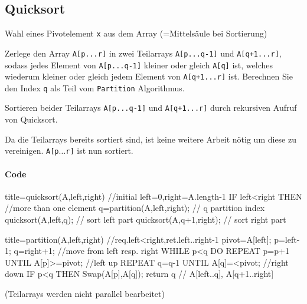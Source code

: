 \documentclass[
    ngerman,
    color=3b,
    dark_mode,
    summary,
    boxarc,
]{rubos-tuda-template}
\begin{document}
\clearpage
\subsection{Quicksort}\label{Quicksort}
\begin{idea}[Quicksort]\mbox{}
    \begin{description}[leftmargin=2.5cm,itemsep=1em]
        \item [Pivotelement]
              Wahl eines Pivotelement \texttt{x} aus dem Array (=Mittelsäule bei Sortierung)
        \item [Divide]
              Zerlege den Array \texttt{A[p...r]} in zwei Teilarrays \texttt{A[p...q-1]} und \texttt{A[q+1...r]},
              sodass jedes Element von \texttt{A[p...q-1]} kleiner oder gleich \texttt{A[q]} ist, welches
              wiederum kleiner oder gleich jedem Element von \texttt{A[q+1...r]} ist. Berechnen Sie den Index \texttt{q}
              als Teil vom \texttt{Partition} Algorithmus.
        \item [Conquer]
              Sortieren beider Teilarrays \texttt{A[p...q-1]} und \texttt{A[q+1...r]} durch rekursiven Aufruf von
              Quicksort.
        \item [Combine]
              Da die Teilarrays bereits sortiert sind, ist keine weitere Arbeit nötig um diese zu vereinigen.
              \texttt{A[p$\ldots$r]} ist nun sortiert.
    \end{description}

\end{idea}

\paragraph{Code}\mbox{}
          \begin{codeBlock}[autogobble,escapeinside=||]{title={quicksort(A,left,right)} //initial left=0,right=A.length-1}
            IF left<right THEN //more than one element
                q=partition(A,left,right); // q partition index
                quicksort(A,left,q); // sort left part
                quicksort(A,q+1,right); // sort right part
          \end{codeBlock}
          \begin{codeBlock}[autogobble,escapeinside=||]{title={partition(A,left,right)}  //req.left<right,ret.left..right-1}
            pivot=A[left];
            p=left-1; q=right+1; //move from left resp. right
            WHILE p<q DO
                REPEAT p=p+1 UNTIL A[p]>=pivot; //left up
                REPEAT q=q-1 UNTIL A[q]=<pivot; //right down
                IF p<q THEN Swap(A[p],A[q]);
            return q // A[left..q], A[q+1..right]
          \end{codeBlock}
(Teilarrays werden nicht parallel bearbeitet)
\clearpage
\end{document}
